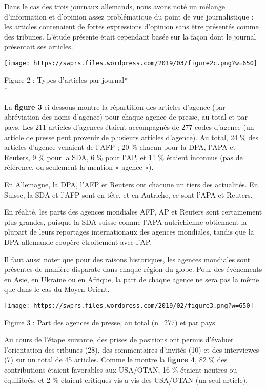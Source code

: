 Dans le cas des trois journaux allemands, nous avons noté un mélange
d'information et d'opinion assez problématique du point de vue
journalistique : les articles contenaient de fortes expressions
d'opinion sans être présentés comme des tribunes. L'étude présente était
cependant basée sur la façon dont le journal présentait ses articles.

\texttt{[image: https://swprs.files.wordpress.com/2019/03/figure2c.png?w=650]}

Figure 2 : Types d'articles par journal*\\
*

La \textbf{figure 3} ci-dessous montre la répartition des articles
d'agence (par abréviation des noms d'agence) pour chaque agence de
presse, au total et par pays. Les 211 articles d'agences étaient
accompagnés de 277 codes d'agence (un article de presse peut provenir de
plusieurs articles d'agence). Au total, 24 \% des articles d'agence
venaient de l'AFP ; 20 \% chacun pour la DPA, l'APA et Reuters, 9 \%
pour la SDA, 6 \% pour l'AP, et 11 \% étaient inconnus (pas de
référence, ou seulement la mention « agence »).

En Allemagne, la DPA, l'AFP et Reuters ont chacune un tiers des
actualités. En Suisse, la SDA et l'AFP sont en tête, et en Autriche, ce
sont l'APA et Reuters.

En réalité, les parts des agences mondiales AFP, AP et Reuters sont
certainement plus grandes, puisque la SDA suisse comme l'APA
autrichienne obtiennent la plupart de leurs reportages internationaux
des agences mondiales, tandis que la DPA allemande coopère étroitement
avec l'AP.

Il faut aussi noter que pour des raisons historiques, les agences
mondiales sont présentes de manière disparate dans chaque région du
globe. Pour des événements en Asie, en Ukraine ou en Afrique, la part de
chaque agence ne sera pas la même que dans le cas du Moyen-Orient.

\texttt{[image: https://swprs.files.wordpress.com/2019/02/figure3.png?w=650]}

Figure 3 : Part des agences de presse, au total (n=277) et par pays

Au cours de l'étape suivante, des prises de positions ont permis
d'évaluer l'orientation des tribunes (28), des commentaires d'invités
(10) et des interviewes (7) sur un total de 45 articles. Comme le montre
la \textbf{figure 4}, 82 \% des contributions étaient favorables aux
USA/OTAN, 16 \% étaient neutres ou équilibrés, et 2 \% étaient critiques
vis-a-vis des USA/OTAN (un seul article).

